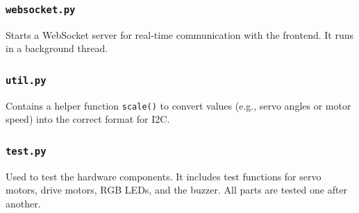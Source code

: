     \subsubsection*{\texttt{websocket.py}}
    Starts a WebSocket server for real-time communication with the frontend. It runs in a background thread.

    \subsubsection*{\texttt{util.py}}
    Contains a helper function \texttt{scale()} to convert values (e.g., servo angles or motor speed) into the correct format for I2C.

    \subsubsection*{\texttt{test.py}}
    Used to test the hardware components. It includes test functions for servo motors, drive motors, RGB LEDs, and the buzzer. All parts are tested one after another.
